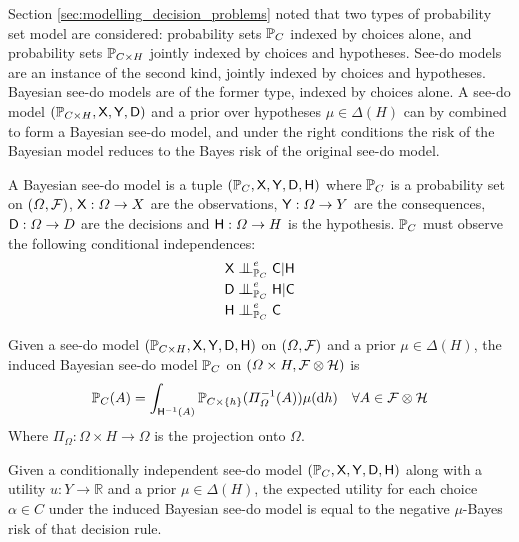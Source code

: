 Section \ref{sec:modelling_decision_problems} noted that two types of probability set model are considered: probability sets $\mathbb{P}_C$ indexed by choices alone, and probability sets $\mathbb{P}_{C\times H}$ jointly indexed by choices and hypotheses. See-do models are an instance of the second kind, jointly indexed by choices and hypotheses. Bayesian see-do models are of the former type, indexed by choices alone. A see-do model $(\mathbb{P}_{C\times H}, \mathsf{X},\mathsf{Y},\mathsf{D})$ and a prior over hypotheses $\mu\in \Delta(H)$ can by combined to form a Bayesian see-do model, and under the right conditions the risk of the Bayesian model reduces to the Bayes risk of the original see-do model.

\begin{definition}
A Bayesian see-do model is a tuple $(\mathbb{P}_{C}, \mathsf{X},\mathsf{Y},\mathsf{D},\mathsf{H})$ where $\mathbb{P}_C$ is a probability set on $(\Omega,\mathcal{F})$, $\mathsf{X}:\Omega\to X$ are the observations, $\mathsf{Y}:\Omega\to Y$ are the consequences, $\mathsf{D}:\Omega\to D$ are the decisions and $\mathsf{H}:\Omega\to H$ is the hypothesis. $\mathbb{P}_C$ must observe the following conditional independences:
\begin{align}
    \RV{X}&\CI^e_{\prob{P}_{C}} \RV{C}|\RV{H}\\
    \RV{D}&\CI^e_{\prob{P}_{C}} \RV{H}|\RV{C}\\
    \RV{H}&\CI^e_{\prob{P}_C} \RV{C}
\end{align}
\end{definition}

\begin{definition}
Given a see-do model $(\mathbb{P}_{C\times H}, \mathsf{X},\mathsf{Y},\mathsf{D},\mathsf{H})$ on $(\Omega,\mathcal{F})$ and a prior $\mu\in \Delta(H)$, the induced Bayesian see-do model $\mathbb{P}_C$ on $(\Omega\times H,\mathcal{F}\otimes \mathcal{H})$ is
\begin{align}
    \mathbb{P}_C(A) &= \int_{\mathsf{H}^{-1}(A)} \mathbb{P}_{C\times \{h\}}(\Pi_{\Omega}^{-1}(A))\mu(\mathrm{d}h)&\forall A\in \mathcal{F}\otimes\mathcal{H}
\end{align}
Where $\Pi_\Omega:\Omega\times H\to \Omega$ is the projection onto $\Omega$.
\end{definition}

\begin{theorem}
Given a conditionally independent see-do model $(\mathbb{P}_{C}, \mathsf{X},\mathsf{Y},\mathsf{D},\mathsf{H})$ along with a utility $u:Y\to \mathbb{R}$ and a prior $\mu\in \Delta(H)$, the expected utility for each choice $\alpha\in C$ under the induced Bayesian see-do model is equal to the negative $\mu$-Bayes risk of that decision rule.
\end{theorem}

